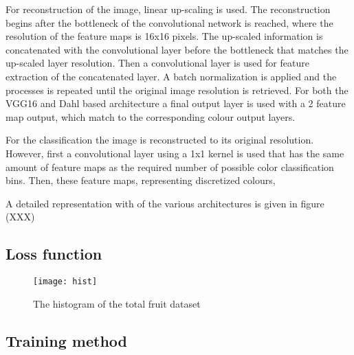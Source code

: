 {For reconstruction of the image, linear up-scaling is used. The reconstruction begins after the bottleneck of the convolutional network is reached, where the resolution of the feature maps is 16x16 pixels. The up-scaled information is concatenated with the convolutional layer before the bottleneck that matches the up-scaled layer resolution. Then a convolutional layer is used for feature extraction of the concatenated layer. A batch normalization is applied and the processes is repeated until the original image resolution is retrieved. For both the VGG16 and Dahl based architecture a final output layer is used with a 2 feature map output, which match to the corresponding colour output layers.

For the classification the image is reconstructed to its original resolution. However, first a convolutional layer using a 1x1 kernel is used that has the same amount of feature maps as the required number of possible color classification bins. Then, these feature maps, representing discretized colours, %


A detailed representation with of the various architectures is given in figure {\color{red}(XXX)}}

\subsection{Loss function}

\begin{wrapfigure}{r}{0.5\textwidth}
	\vspace{-20pt}
	\begin{center}
		\texttt{[image: hist]}
	\end{center}
	\caption{\color{red} The histogram of the total fruit dataset}
	\vspace{-10pt}
\end{wrapfigure}

\subsection{Training method}


